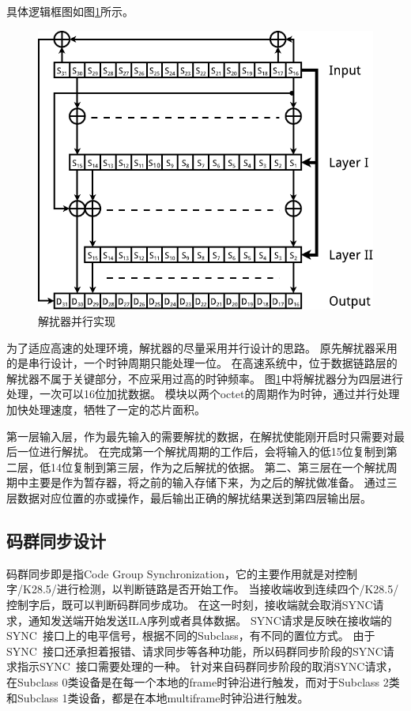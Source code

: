 \documentclass[UTF8]{ctexart}
\begin{document}
具体逻辑框图如图\ref{fig:scrambler_descrambler_parallel_implementation}所示。

\begin{figure}[H]
\centering
\includegraphics[width=18cm]{./img/scrambler_descrambler_parallel_implementation.pdf}
\caption{解扰器并行实现}
\label{fig:scrambler_descrambler_parallel_implementation}
\end{figure}

为了适应高速的处理环境，解扰器的尽量采用并行设计的思路。
原先解扰器采用的是串行设计，一个时钟周期只能处理一位。
在高速系统中，位于数据链路层的解扰器不属于关键部分，不应采用过高的时钟频率。
图\ref{fig:scrambler_descrambler_parallel_implementation}中将解扰器分为四层进行处理，一次可以16位加扰数据。
模块以两个octet的周期作为时钟，通过并行处理加快处理速度，牺牲了一定的芯片面积。

第一层输入层，作为最先输入的需要解扰的数据，在解扰使能刚开启时只需要对最后一位进行解扰。
在完成第一个解扰周期的工作后，会将输入的低15位复制到第二层，低14位复制到第三层，作为之后解扰的依据。
第二、第三层在一个解扰周期中主要是作为暂存器，将之前的输入存储下来，为之后的解扰做准备。
通过三层数据对应位置的亦或操作，最后输出正确的解扰结果送到第四层输出层。

\subsection{码群同步设计}

码群同步即是指Code Group Synchronization，它的主要作用就是对控制字/K28.5/进行检测，以判断链路是否开始工作。
当接收端收到连续四个/K28.5/控制字后，既可以判断码群同步成功。
在这一时刻，接收端就会取消SYNC请求，通知发送端开始发送ILA序列或者具体数据。
SYNC请求是反映在接收端的SYNC~接口上的电平信号，根据不同的Subclass，有不同的置位方式。
由于SYNC~接口还承担着报错、请求同步等各种功能，所以码群同步阶段的SYNC请求指示SYNC~接口需要处理的一种。
针对来自码群同步阶段的取消SYNC请求，在Subclass 0类设备是在每一个本地的frame时钟沿进行触发，而对于Subclass 2类和Subclass 1类设备，都是在本地multiframe时钟沿进行触发。
\end{document}
